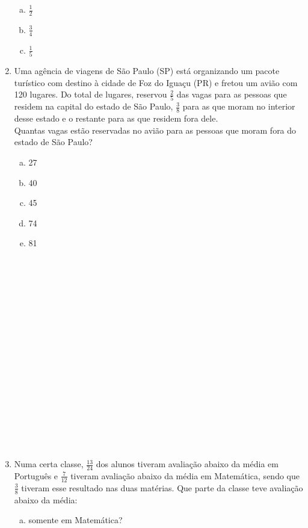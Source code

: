 \documentclass[a4paper,14pt]{article}
\begin{document}
\begin{multicols}{2}
\begin{enumerate}
\begin{enumerate}[a)]
   				\item $\frac{1}{2}$
   				\item $\frac{3}{4}$
   				\item $\frac{1}{5}$
   			\end{enumerate}
   			\newpage
   			\item Uma agência de viagens de São Paulo (SP) está organizando um pacote turístico com destino à cidade de Foz do Iguaçu (PR) e fretou um avião com 120 lugares. Do total de lugares, reservou $\frac{2}{5}$ das vagas para as pessoas que residem na capital do estado de São Paulo, $\frac{3}{8}$ para as que moram no interior desse estado e o restante para as que residem fora dele. \\
   			Quantas vagas estão reservadas no avião para as pessoas que moram fora do estado de São Paulo?
   			\begin{enumerate}[a)]
   				\item 27
   				\item 40
   				\item 45
   				\item 74
   				\item 81 \\\\\\\\\\\\\\\\\\\\\\\\\\\\\\\\\\\\
   			\end{enumerate}
   			\item Numa certa classe, $\frac{13}{24}$ dos alunos tiveram avaliação abaixo da média em Português e $\frac{7}{12}$ tiveram avaliação abaixo da média em Matemática, sendo que $\frac{3}{8}$ tiveram esse resultado nas duas matérias. Que parte da classe teve avaliação abaixo da média:
   			\begin{enumerate}[a)]
   				\item somente em Matemática? \\\\\\\\\\\\\\\\\\\\\\\\\\\\

\end{enumerate}
\end{enumerate}
\end{multicols}
\end{document}

